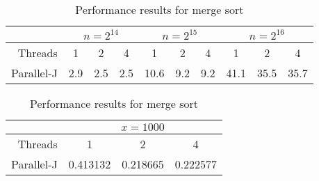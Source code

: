 \begin{table}[htbp]
\begin{tabular}{|r||c|c|c||c|c|c||c|c|c||}
	\hline
		& \multicolumn{3}{|c|}{$n=2^{14}$} & \multicolumn{3}{|c|}{$n=2^{15}$}& \multicolumn{3}{|c|}{$n=2^{16}$} \\
	\hline
		Threads & 1 & 2 & 4 & 1 & 2 & 4 & 1 & 2 & 4 \\
	\hline
	\hline
		Parallel-J & 2.9 & 2.5 & 2.5 & 10.6 & 9.2 & 9.2 & 41.1 & 35.5 & 35.7 \\
	\hline
\end{tabular}
\begin{tabular}{|r||c|c|c||}
	\hline
		& \multicolumn{3}{|c|}{$x=1000$} \\
	\hline
		Threads & 1 & 2 & 4 \\
	\hline
	\hline
		Parallel-J & 0.413132 & 0.218665 & 0.222577 \\
	\hline
\end{tabular}
\caption{Performance results for merge sort}
\label{tmrg}
\end{table}
